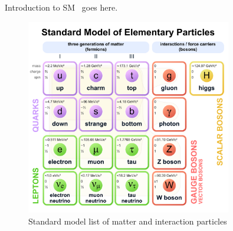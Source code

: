Introduction to \gls{SM}~\cite{Yang-Mill:1954} goes here.

\begin{figure}[!ht]
  \centering
  \includegraphics[width=0.8\textwidth]{figures/Standard_Model_of_Elementary_Particles.pdf}
  \caption[Standard model list of matter and interaction particles]%
  {Standard model list of matter and interaction particles~\cite{image-standard-model}}%
  \label{fig:standard-model-details}
\end{figure}

